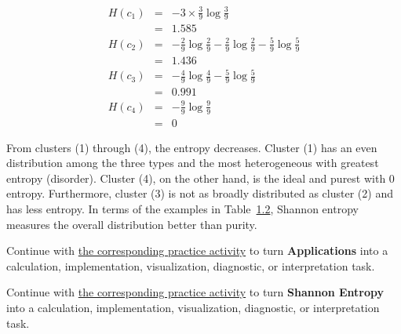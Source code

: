 \documentclass[
  letterpaper,
]{scrbook}
\begin{document}
\[\begin{aligned}
  H(c_1)
  & = & - 3 \times \frac{3}{9} \log \frac{3}{9} \\
  & = & 1.585 \\
  H(c_2)
  & = & - \frac{2}{9} \log \frac{2}{9} - \frac{2}{9} \log \frac{2}{9} - \frac{5}{9} \log \frac{5}{9}\\
  & = & 1.436 \\
  H(c_3)
  & = & - \frac{4}{9} \log \frac{4}{9} - \frac{5}{9} \log \frac{5}{9}\\
  & = & 0.991 \\
  H(c_4)
  & = & - \frac{9}{9} \log \frac{9}{9} \\
  & = & 0
\end{aligned}\]

From clusters (1) through (4), the entropy decreases. Cluster (1) has an
even distribution among the three types and the most heterogeneous with
greatest entropy (disorder). Cluster (4), on the other hand, is the
ideal and purest with \(0\) entropy. Furthermore, cluster (3) is not as
broadly distributed as cluster (2) and has less entropy. In terms of the
examples in Table~\hyperref[tab-info-groups]{1.2}, Shannon entropy
measures the overall distribution better than purity.

\begin{tcolorbox}[enhanced jigsaw, arc=.35mm, bottomrule=.15mm, bottomtitle=1mm, breakable, colback=white, colbacktitle=quarto-callout-tip-color!10!white, colframe=quarto-callout-tip-color-frame, coltitle=black, left=2mm, leftrule=.75mm, opacityback=0, opacitybacktitle=0.6, rightrule=.15mm, title=\textcolor{quarto-callout-tip-color}{\faLightbulb}\hspace{0.5em}{Put it into practice}, titlerule=0mm, toprule=.15mm, toptitle=1mm]

Continue with \hyperref[sec-pr-05-applications]{the corresponding
practice activity} to turn \textbf{Applications} into a calculation,
implementation, visualization, diagnostic, or interpretation task.

\end{tcolorbox}

\begin{tcolorbox}[enhanced jigsaw, arc=.35mm, bottomrule=.15mm, bottomtitle=1mm, breakable, colback=white, colbacktitle=quarto-callout-tip-color!10!white, colframe=quarto-callout-tip-color-frame, coltitle=black, left=2mm, leftrule=.75mm, opacityback=0, opacitybacktitle=0.6, rightrule=.15mm, title=\textcolor{quarto-callout-tip-color}{\faLightbulb}\hspace{0.5em}{Put it into practice}, titlerule=0mm, toprule=.15mm, toptitle=1mm]

Continue with \hyperref[sec-pr-05-shannon-entropy]{the corresponding
practice activity} to turn \textbf{Shannon Entropy} into a calculation,
implementation, visualization, diagnostic, or interpretation task.

\end{tcolorbox}
\end{document}
